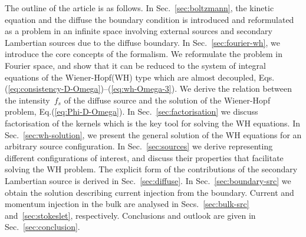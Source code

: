 \documentclass[preprint,aps,eqsecnum]{revtex4-1}
\begin{document}
The outline of the article is as follows. In Sec.~\ref{sec:boltzmann},
the kinetic equation and the diffuse the boundary condition is introduced
and reformulated as a problem in an infinite space involving external
sources and secondary Lambertian sources due to the diffuse boundary. 
In Sec.~\ref{sec:fourier-wh}, we introduce the core concepts of the formalism.
We reformulate the problem in Fourier space, and show that
it can be reduced to the system of integral equations of the
Wiener-Hopf(WH) type which are almost decoupled,
Eqs.(\ref{eq:consistency-D-Omega})--(\ref{eq:wh-Omega-3}).
We derive the relation between the intensity~$f_s$ of the diffuse source
and the solution of the  Wiener-Hopf problem, Eq.(\ref{eq:Phi-D-Omega}).
In Sec.~\ref{sec:factorisation} we discuss factorisation of the
kernels which is the key tool for solving the WH equations.
In Sec.~\ref{sec:wh-solution},
we present the general solution of the WH
equations for an arbitrary source configuration.
In Sec.~\ref{sec:sources} we derive 
representing different configurations of interest,
and discuss their properties that facilitate solving the WH problem.
The explicit form of the contributions of the secondary
Lambertian source is derived in Sec.~\ref{sec:diffuse}.
In Sec.~\ref{sec:boundary-src} we obtain the solution describing current
injection from the boundary. Current and momentum injection in the bulk
are analysed in Secs.~\ref{sec:bulk-src} and~\ref{sec:stokeslet}, respectively.
Conclusions and outlook are given in Sec.~\ref{sec:conclusion}.
\end{document}
